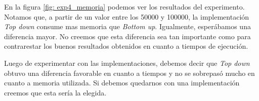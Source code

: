 \par En la figura \ref{fig: exp4_memoria} podemos ver los resultados del experimento. Notamos que, a partir de un valor entre los 50000 y 100000, la implementación \textit{Top down} consume mas memoria que \textit{Bottom up}. Igualmente, esperábamos una diferencia mayor. No creemos que esta diferencia sea tan importante como para contrarestar los buenos resultados obtenidos en cuanto a tiempos de ejecución.

\smallskip

\par Luego de experimentar con las implementaciones, debemos decir que \textit{Top down} obtuvo una diferencia favorable en cuanto a tiempos y no se sobrepasó mucho en cuanto a memoria utilizada. Si debemos quedarnos con una implementación creemos que esta sería la elegida.